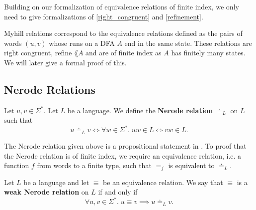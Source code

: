 Building on our formalization of equivalence relations of finite index, 
we only need to give formalizations of \ref{right_congruent} and \ref{refinement}.



Myhill relations correspond to the equivalence relations 
defined as the pairs of words $(u, v)$ whose runs on a DFA $A$ end in the same state. 
These relations are right congruent, refine $\lang{A}$ and are of finite index as $A$ has finitely many states. 
We will later give a formal proof of this.

\subsection{Nerode Relations}

\begin{definition}
    \label{suffix_equal}
    Let $u, v \in \Sigma^*$. Let $L$ be a language. We define the \textbf{Nerode relation} $\doteq_L$ on $L$ such that 
    \begin{equation*}
        u \doteq_L v \iff \forall w \in \Sigma^*. \; uw \in L \Leftrightarrow vw \in L. 
    \end{equation*}
\end{definition}


The Nerode relation given above is a propositional statement in \coq. 
To proof that the Nerode relation is of finite index, 
we require an equivalence relation, 
i.e. a function $f$ from words to a finite type,
such that $=_f$ is equivalent to $\doteq_L$.


\begin{definition}
    \label{Weak_Nerode_Rel}
    Let $L$ be a language and let $\equiv$ be an equivalence relation. We say that $\equiv$ is a \textbf{weak Nerode relation} on $L$ if and only if
    \begin{equation*}
        \forall u, v \in \Sigma^*. \; u \equiv v \implies u \doteq_L v.
    \end{equation*}
\end{definition}




